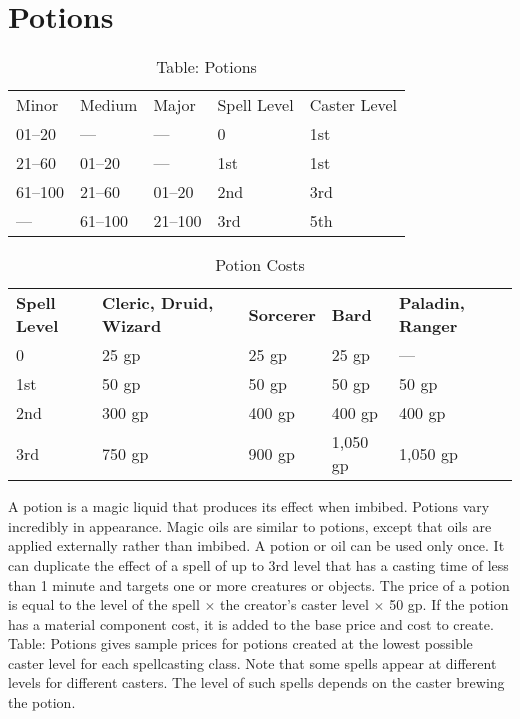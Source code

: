 \section{Potions}

\label{f0}
\begin{table}[]
\sffamily
\caption{Table: Potions}
\begin{tabular}{lllll}
Minor & Medium & Major & Spell Level & Caster Level\\
01–20 & — & — & 0 & 1st\\
21–60 & 01–20 & — & 1st & 1st\\
 61–100 & 21–60 & 01–20 & 2nd & 3rd\\
 — & 61–100 & 21–100 & 3rd & 5th\\
\end{tabular}
\end{table}

\begin{table}
 \sffamily
 \caption{Potion Costs}
 \begin{tabular}{lllll}
\textbf{Spell Level} & \textbf{Cleric, Druid, Wizard} & \textbf{Sorcerer} & \textbf{Bard} & \textbf{Paladin, Ranger} \\
0 & 25 gp & 25 gp & 25 gp & ---\\
1st & 50 gp & 50 gp & 50 gp & 50 gp\\
2nd & 300 gp & 400 gp & 400 gp & 400 gp\\
3rd & 750 gp & 900 gp & 1,050 gp & 1,050 gp\\
 \end{tabular}

\end{table}

				
A potion is a magic liquid that produces its effect when imbibed. Potions vary incredibly in appearance. Magic oils are similar to potions, except that oils are applied externally rather than imbibed. A potion or oil can be used only once. It can duplicate the effect of a spell of up to 3rd level that has a casting time of less than 1 minute and targets one or more creatures or objects. The price of a potion is equal to the level of the spell \mbox{$\times$} the creator's caster level \mbox{$\times$} 50 gp. If the potion has a material component cost, it is added to the base price and cost to create. Table: Potions gives sample prices for potions created at the lowest possible caster level for each spellcasting class. Note that some spells appear at different levels for different casters. The level of such spells depends on the caster brewing the potion.
				
